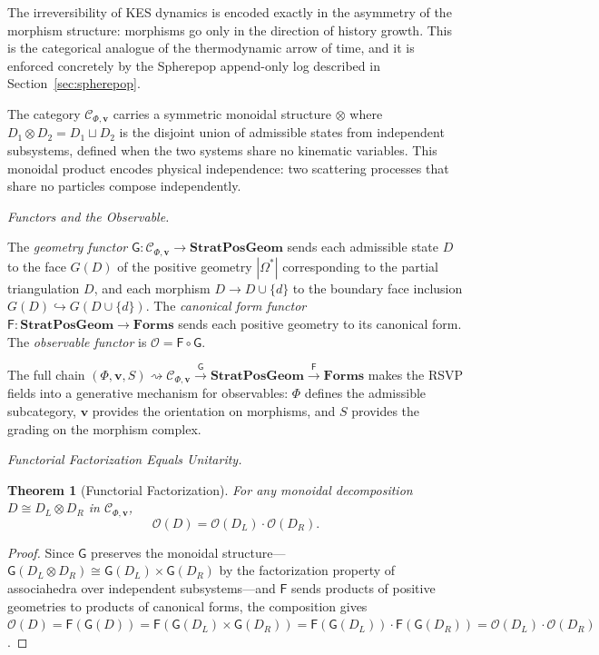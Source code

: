 \documentclass[11pt]{article}
\theoremstyle{plain}
\newtheorem{theorem}{Theorem}[section]
\theoremstyle{definition}
\theoremstyle{remark}
\newcommand{\Phif}{\Phi}
\newcommand{\Sf}{S}
\newcommand{\OmKS}{\Omega}
\newcommand{\SPG}{\mathbf{StratPosGeom}}
\newcommand{\Forms}{\mathbf{Forms}}
\newcommand{\Ccat}{\mathcal{C}_{\Phi,\mathbf{v}}}
\newcommand{\Gfun}{\mathsf{G}}
\newcommand{\Ffun}{\mathsf{F}}
\newcommand{\Ofun}{\mathcal{O}}
\begin{document}
The irreversibility of KES dynamics is encoded exactly in the asymmetry of the morphism structure: morphisms go only in the direction of history growth. This is the categorical analogue of the thermodynamic arrow of time, and it is enforced concretely by the Spherepop append-only log described in Section~\ref{sec:spherepop}.

The category $\Ccat$ carries a symmetric monoidal structure $\otimes$ where $D_1 \otimes D_2 = D_1 \sqcup D_2$ is the disjoint union of admissible states from independent subsystems, defined when the two systems share no kinematic variables. This monoidal product encodes physical independence: two scattering processes that share no particles compose independently.

\medskip\noindent\textit{Functors and the Observable.}

The \emph{geometry functor} $\Gfun: \Ccat \to \SPG$ sends each admissible state $D$ to the face $G(D)$ of the positive geometry $|\OmKS^*|$ corresponding to the partial triangulation $D$, and each morphism $D \to D \cup \{d\}$ to the boundary face inclusion $G(D) \hookrightarrow G(D \cup \{d\})$. The \emph{canonical form functor} $\Ffun: \SPG \to \Forms$ sends each positive geometry to its canonical form. The \emph{observable functor} is $\Ofun = \Ffun \circ \Gfun$.

The full chain $(\Phif, \mathbf{v}, \Sf) \rightsquigarrow \Ccat \xrightarrow{\Gfun} \SPG \xrightarrow{\Ffun} \Forms$ makes the RSVP fields into a generative mechanism for observables: $\Phif$ defines the admissible subcategory, $\mathbf{v}$ provides the orientation on morphisms, and $\Sf$ provides the grading on the morphism complex.

\medskip\noindent\textit{Functorial Factorization Equals Unitarity.}

\begin{theorem}[Functorial Factorization]
\label{thm:factorization}
For any monoidal decomposition $D \cong D_L \otimes D_R$ in $\Ccat$,
\[
  \Ofun(D) = \Ofun(D_L) \cdot \Ofun(D_R).
\]
\end{theorem}

\begin{proof}
Since $\Gfun$ preserves the monoidal structure---$\Gfun(D_L \otimes D_R) \cong \Gfun(D_L) \times \Gfun(D_R)$ by the factorization property of associahedra over independent subsystems---and $\Ffun$ sends products of positive geometries to products of canonical forms, the composition gives $\Ofun(D) = \Ffun(\Gfun(D)) = \Ffun(\Gfun(D_L) \times \Gfun(D_R)) = \Ffun(\Gfun(D_L)) \cdot \Ffun(\Gfun(D_R)) = \Ofun(D_L) \cdot \Ofun(D_R)$.
\end{proof}
\end{document}
